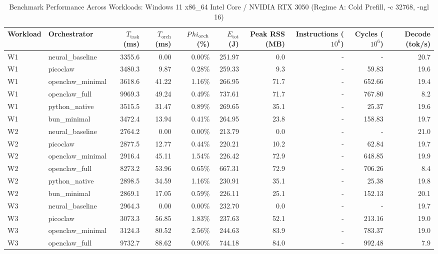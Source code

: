 \begin{table}[t]
\centering\small
\caption{Benchmark Performance Across Workloads: Windows 11 x86_64 Intel Core / NVIDIA RTX 3050 (Regime A: Cold Prefill, -c 32768, -ngl 16)}
\label{tab:Windows_master_summary}
\begin{tabular}{llrrrrrrrr}
\toprule
Workload & Orchestrator & $T_{\text{task}}$ (ms) & $T_{\text{orch}}$ (ms) & $\\Phi_{\text{orch}}$ (\%) & $E_{\text{tot}}$ (J) & Peak RSS (MB) & Instructions ($10^6$) & Cycles ($10^6$) & Decode (tok/s) \\
\midrule
W1 & neural\_baseline & 3355.6 & 0.00 & 0.00\% & 251.97 & 0.0 & - & - & 20.7 \\
W1 & picoclaw & 3480.3 & 9.87 & 0.28\% & 259.33 & 9.3 & - & 59.83 & 19.6 \\
W1 & openclaw\_minimal & 3618.6 & 41.22 & 1.16\% & 266.95 & 71.7 & - & 652.66 & 19.4 \\
W1 & openclaw\_full & 9969.3 & 49.24 & 0.49\% & 737.61 & 71.7 & - & 767.80 & 8.2 \\
W1 & python\_native & 3515.5 & 31.47 & 0.89\% & 269.65 & 35.1 & - & 25.37 & 19.6 \\
W1 & bun\_minimal & 3472.4 & 13.94 & 0.41\% & 264.95 & 23.8 & - & 158.83 & 19.7 \\
\midrule
W2 & neural\_baseline & 2764.2 & 0.00 & 0.00\% & 213.79 & 0.0 & - & - & 21.0 \\
W2 & picoclaw & 2877.5 & 12.77 & 0.44\% & 220.21 & 10.2 & - & 62.84 & 19.7 \\
W2 & openclaw\_minimal & 2916.4 & 45.11 & 1.54\% & 226.42 & 72.9 & - & 648.85 & 19.9 \\
W2 & openclaw\_full & 8273.2 & 53.96 & 0.65\% & 667.31 & 72.9 & - & 706.26 & 8.4 \\
W2 & python\_native & 2898.5 & 34.59 & 1.16\% & 230.91 & 35.1 & - & 25.38 & 19.8 \\
W2 & bun\_minimal & 2869.1 & 17.05 & 0.59\% & 226.11 & 25.1 & - & 152.13 & 20.1 \\
\midrule
W3 & neural\_baseline & 2964.3 & 0.00 & 0.00\% & 232.70 & 0.0 & - & - & 19.7 \\
W3 & picoclaw & 3073.3 & 56.85 & 1.83\% & 237.63 & 52.1 & - & 213.16 & 19.0 \\
W3 & openclaw\_minimal & 3124.3 & 80.52 & 2.56\% & 244.63 & 83.9 & - & 783.37 & 19.0 \\
W3 & openclaw\_full & 9732.7 & 88.62 & 0.90\% & 744.18 & 84.0 & - & 992.48 & 7.9 \\

\end{tabular}
\end{table}
